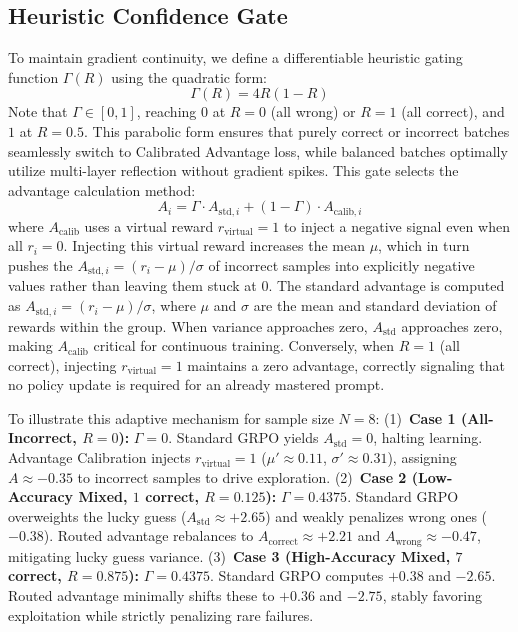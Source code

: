 \subsection{Heuristic Confidence Gate}\label{subsec:heuristic_gate}
To maintain gradient continuity, we define a differentiable heuristic gating function $\Gamma(R)$ using the quadratic form:
\begin{equation}
\Gamma(R) = 4R(1-R)
\end{equation}
Note that $\Gamma \in [0, 1]$, reaching $0$ at $R=0$ (all wrong) or $R=1$ (all correct), and $1$ at $R=0.5$. This parabolic form ensures that purely correct or incorrect batches seamlessly switch to Calibrated Advantage loss, while balanced batches optimally utilize multi-layer reflection without gradient spikes. This gate selects the advantage calculation method:
\begin{equation}
A_i = \Gamma \cdot A_{\text{std}, i} + (1-\Gamma) \cdot A_{\text{calib}, i}
\end{equation}
where $A_{\text{calib}}$ uses a virtual reward $r_{\text{virtual}} = 1$ to inject a negative signal even when all $r_i=0$. Injecting this virtual reward increases the mean $\mu$, which in turn pushes the $A_{\text{std},i}=(r_i-\mu)/\sigma$ of incorrect samples into explicitly negative values rather than leaving them stuck at 0. The standard advantage is computed as $A_{\text{std}, i} = (r_i - \mu) / \sigma$, where $\mu$ and $\sigma$ are the mean and standard deviation of rewards within the group. When variance approaches zero, $A_{\text{std}}$ approaches zero, making $A_{\text{calib}}$ critical for continuous training. Conversely, when $R=1$ (all correct), injecting $r_{\text{virtual}}=1$ maintains a zero advantage, correctly signaling that no policy update is required for an already mastered prompt.

To illustrate this adaptive mechanism for sample size $N=8$:
(1)~\textbf{Case 1 (All-Incorrect, $R=0$):} $\Gamma=0$. Standard GRPO yields $A_{\text{std}}=0$, halting learning. Advantage Calibration injects $r_{\text{virtual}}=1$ ($\mu' \approx 0.11$, $\sigma' \approx 0.31$), assigning $A \approx -0.35$ to incorrect samples to drive exploration.
(2)~\textbf{Case 2 (Low-Accuracy Mixed, $1$ correct, $R=0.125$):} $\Gamma=0.4375$. Standard GRPO overweights the lucky guess ($A_{\text{std}} \approx +2.65$) and weakly penalizes wrong ones ($-0.38$). Routed advantage rebalances to $A_{\text{correct}} \approx +2.21$ and $A_{\text{wrong}} \approx -0.47$, mitigating lucky guess variance.
(3)~\textbf{Case 3 (High-Accuracy Mixed, $7$ correct, $R=0.875$):} $\Gamma=0.4375$. Standard GRPO computes $+0.38$ and $-2.65$. Routed advantage minimally shifts these to $+0.36$ and $-2.75$, stably favoring exploitation while strictly penalizing rare failures.

